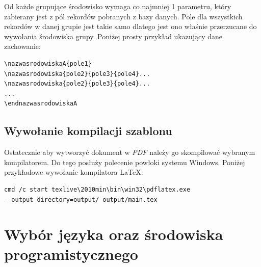 \vspace{5mm}
Od każde grupujące środowisko wymaga co najmniej 1 parametru, który zabierany jest z pól rekordów pobranych z bazy danych. Pole dla wszystkich rekordów w danej grupie jest takie samo dlatego jest ono właśnie przerzucane do wywołania środowiska grupy.
Poniżej prosty przykład ukazujący dane zachowanie:
\begin{lstlisting}
\nazwasrodowiskaA{pole1}
\nazwasrodowiska{pole2}{pole3}{pole4}...
\nazwasrodowiska{pole2}{pole3}{pole4}...
...
\endnazwasrodowiskaA
\end{lstlisting}

\subsection{Wywołanie kompilacji szablonu}

Ostatecznie aby wytworzyć dokument w \emph{PDF} należy go skompilować wybranym kompilatorem. Do tego posłuży polecenie powłoki systemu Windows. Poniżej przykładowe wywołanie kompilatora LaTeX:
\begin{lstlisting}
cmd /c start texlive\2010min\bin\win32\pdflatex.exe 
--output-directory=output/ output/main.tex
\end{lstlisting}


\section{Wybór języka oraz środowiska programistycznego }


